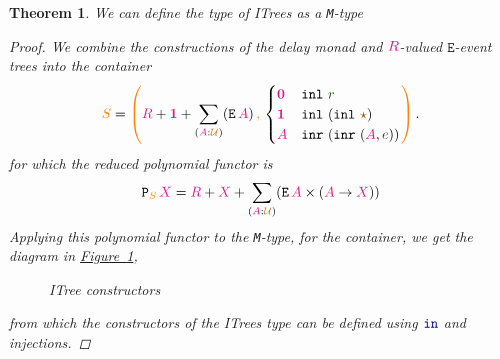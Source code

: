 \documentclass[twoside,11pt,openright]{report}
\theoremstyle{plain} %
\newtheorem{thm}{Theorem}[section]
\theoremstyle{definition}
\theoremstyle{remark}
\newcommand*{\figref}[1]{\hyperref[fig:#1]{Figure~\ref*{fig:#1}}}
\newcommand*{\term}[1]{\textcolor{green!30!black}{#1}} %
\newcommand*{\type}[1]{\textcolor{magenta!90!black}{#1}}
\newcommand*{\container}[1]{\textcolor{orange}{#1}}
\newcommand*{\containerpair}[2]{\ensuremath{\colorlet{savedleftcolor}{.}\color{orange}\left(\color{savedleftcolor}#1\,\textcolor{orange}{\mathbf{,}}\,#2\color{orange}\right)\color{savedleftcolor}}}
\newcommand*{\universe}[1]{\textcolor{orange!80!black}{#1}}
\newcommand*{\unit}{\type{\textbf{1}}}
\newcommand*{\empt}{\type{\textbf{0}}}
\newcommand*{\constant}[1]{\textcolor{orange!60!black}{\ensuremath{\mathtt{#1}}}}
\newcommand*{\function}[1]{\textcolor{blue!60!black}{\ensuremath{\mathtt{#1}}}}
\newcommand*{\constructor}[1]{\textcolor{purple!60!black}{\ensuremath{\mathtt{#1}}}}
\newcommand*{\typeformer}[1]{\ensuremath{\mathtt{#1}}}
\newcommand*{\functor}[1]{\ensuremath{\mathbf{\mathtt{#1}}}}
\newcommand*{\unitelem}{\constant{\star}} %
\begin{document}
\begin{thm}
  We can define the type of ITrees as a \texttt{M}-type
  \begin{proof}
    We combine the constructions of the delay monad and \(\type{R}\)-valued \(\typeformer{E}\)-event trees into the container
    \begin{equation}
      \container{S} = \containerpair{\type{R}+\unit+\sum_{(\type{A}:\universe{\mathcal{U}})} (\typeformer{E}\,\type{A})}{\begin{cases} \empt & \texttt{inl}~\term{r} \\ \unit & \texttt{inl}~(\texttt{inl}~\unitelem) \\ \type{A} & \texttt{inr}~(\texttt{inr}~(\type{A},\term{e})) \end{cases}}.
    \end{equation}
    \noindent for which the reduced polynomial functor is
    \begin{equation}
      \functor{P}_{\container{S}}\,\type{X} = \type{R} + \type{X} + \sum_{(\type{A} : \universe{\mathcal{U}})} (\typeformer{E}\,\type{A} \times (\type{A} \rightarrow \type{X}))
    \end{equation}
    Applying this polynomial functor to the \texttt{M}-type, for the container, we get the diagram in \figref{ITree-constructors},
    \begin{figure}[h]
      \centering
      \caption{ITree constructors}
      \label{fig:ITree-constructors}
    \end{figure}
    from which the constructors of the ITrees type can be defined using \(\function{in}\) and injections.
  \end{proof}
\end{thm}
\end{document}
